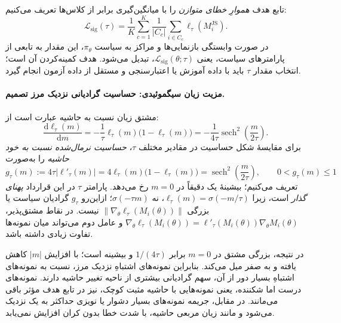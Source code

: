 تابع هدف \emph{هموارِ خطای متوازن} را با میانگین‌گیری برابر از کلاس‌ها تعریف می‌کنیم:
\begin{equation}\label{eq:ch3-js-sigmoid-balanced-objective}
\boxed{
\mathcal L_{\mathrm{sig}}(\tau)
=\frac1K\sum_{c=1}^{K}\frac1{|C_c|}
\sum_{i\in C_c}\ell_\tau(M_i^{\mathrm{JS}}).
}
\end{equation}
در صورت وابستگی بازنمایی‌ها و مراکز به سیاست $\pi_\theta$، این مقدار به تابعی از پارامترهای سیاست، یعنی $\mathcal L_{\mathrm{sig}}(\theta;\tau)$، تبدیل می‌شود. هدف کمینه‌کردن آن است؛ انتخاب مقدار $\tau$ باید با داده آموزش یا اعتبارسنجی و مستقل از داده آزمون انجام گیرد.

\paragraph{مزیت زیان سیگموئیدی: حساسیت گرادیانی نزدیک مرز تصمیم.}
مشتق زیان نسبت به حاشیه عبارت است از:
\begin{equation}\label{eq:ch3-js-sigmoid-derivative}
\boxed{
\frac{\mathrm d\ell_\tau(m)}{\mathrm dm}
=-\frac{1}{\tau}\ell_\tau(m)
\bigl(1-\ell_\tau(m)\bigr)
=-\frac{1}{4\tau}
\operatorname{sech}^{2}\!\left(\frac{m}{2\tau}\right).
}
\end{equation}
برای مقایسهٔ شکل حساسیت در مقادیر مختلف
$\tau$، \emph{حساسیت نرمال‌شده نسبت به خود حاشیه} را
به‌صورت
\begin{equation}\label{eq:ch3-js-sigmoid-normalized-sensitivity}
\boxed{
g_\tau(m):=4\tau\left|\ell'_\tau(m)\right|
=4\ell_\tau(m)\bigl(1-\ell_\tau(m)\bigr)
=\operatorname{sech}^{2}\!\left(\frac{m}{2\tau}\right),
\qquad 0<g_\tau(m)\le1
}
\end{equation}
تعریف می‌کنیم؛ بیشینهٔ یک دقیقاً در $m=0$ رخ می‌دهد.
پارامتر $\tau$ در این قرارداد \emph{پهنای گذار}
است، زیرا $\ell_\tau(m)=\sigma(-m/\tau)$،
نه $\sigma(-\tau m)$؛ ازاین‌رو
$g_\tau$ گرادیان سیاست یا بزرگی
$\|\nabla_\theta\ell_\tau(M_i(\theta))\|$
نیست. در نقاط مشتق‌پذیر،
$\nabla_\theta\ell_\tau(M_i(\theta))
=\ell'_\tau(M_i(\theta))\nabla_\theta M_i(\theta)$
و عامل دوم می‌تواند میان نمونه‌ها تفاوت زیادی داشته باشد.

در نتیجه، بزرگی مشتق در $m=0$ برابر $1/(4\tau)$ و بیشینه است؛ با افزایش $|m|$ کاهش یافته و به صفر میل می‌کند. بنابراین نمونه‌های اشتباهِ نزدیک مرز، نسبت به نمونه‌های اشتباهِ بسیار دور از آن، سهم گرادیانی بیشتری از ناحیه تغییر حاشیه دارند. نمونه‌های درست اما شکننده، یعنی نمونه‌هایی با حاشیه مثبت کوچک، نیز در تابع هدف مؤثر باقی می‌مانند. در مقابل، جریمه نمونه‌های بسیار دشوار یا نویزی حداکثر به یک نزدیک می‌شود و مانند زیان مربعی حاشیه، با شدت خطا بدون کران افزایش نمی‌یابد.

